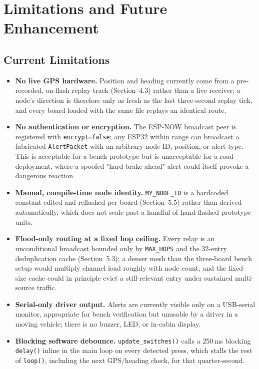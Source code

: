 \documentclass[12pt,a4paper]{report}
\begin{document}
\chapter{Limitations and Future Enhancement}

\section{Current Limitations}
\begin{itemize}[leftmargin=1.6em]
\item \textbf{No live GPS hardware.} Position and heading currently come from a pre-recorded, on-flash replay track (Section~4.3) rather than a live receiver; a node's direction is therefore only as fresh as the last three-second replay tick, and every board loaded with the same file replays an identical route.

\item \textbf{No authentication or encryption.} The ESP-NOW broadcast peer is registered with \texttt{encrypt=false}; any ESP32 within range can broadcast a fabricated \texttt{AlertPacket} with an arbitrary node ID, position, or alert type. This is acceptable for a bench prototype but is unacceptable for a road deployment, where a spoofed "hard brake ahead" alert could itself provoke a dangerous reaction.

\item \textbf{Manual, compile-time node identity.} \texttt{MY\_NODE\_ID} is a hardcoded constant edited and reflashed per board (Section~5.5) rather than derived automatically, which does not scale past a handful of hand-flashed prototype units.

\item \textbf{Flood-only routing at a fixed hop ceiling.} Every relay is an unconditional broadcast bounded only by \texttt{MAX\_HOPS} and the 32-entry deduplication cache (Section~5.3); a denser mesh than the three-board bench setup would multiply channel load roughly with node count, and the fixed-size cache could in principle evict a still-relevant entry under sustained multi-source traffic.

\item \textbf{Serial-only driver output.} Alerts are currently visible only on a USB-serial monitor, appropriate for bench verification but unusable by a driver in a moving vehicle; there is no buzzer, LED, or in-cabin display.

\item \textbf{Blocking software debounce.} \texttt{update\_switches()} calls a 250\,ms blocking \texttt{delay()} inline in the main loop on every detected press, which stalls the rest of \texttt{loop()}, including the next GPS/heading check, for that quarter-second.


\end{itemize}
\end{document}
